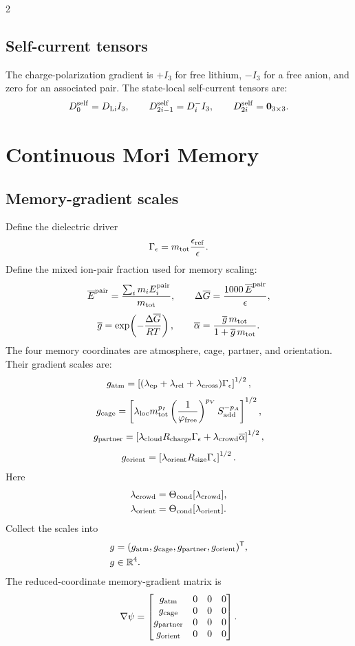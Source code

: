 \documentclass[10pt]{article}
\newcommand{\R}{\mathbb{R}}
\newcommand{\T}{\mathsf{T}}
\newcommand{\zero}{\mathbf{0}}
\begin{document}
\begin{multicols}{2}
\subsection{Self-current tensors}

The charge-polarization gradient is \(+I_3\) for free lithium, \(-I_3\) for a
free anion, and zero for an associated pair. The state-local self-current
tensors are:
\[
D^{\rm self}_0=D_{\rm Li}I_3,
\qquad
D^{\rm self}_{2i-1}=D^-_iI_3,
\qquad
D^{\rm self}_{2i}=\zero_{3\times3}.
\]

\section{Continuous Mori Memory}

\subsection{Memory-gradient scales}

Define the dielectric driver
\[
\Gamma_\epsilon
=
m_{\rm tot}\frac{\epsilon_{\rm ref}}{\epsilon}.
\]
Define the mixed ion-pair fraction used for memory scaling:
\[
\overline{E}^{\rm pair}
=
\frac{\sum_i m_i E^{\rm pair}_i}{m_{\rm tot}},
\qquad
\Delta\overline G
=
\frac{1000\,\overline{E}^{\rm pair}}{\epsilon},
\]
\[
\overline g=\exp\!\left(-\frac{\Delta\overline G}{RT}\right),
\qquad
\overline\alpha
=
\frac{\overline g\,m_{\rm tot}}{1+\overline g\,m_{\rm tot}}.
\]
The four memory coordinates are atmosphere, cage, partner, and orientation.
Their gradient scales are:
\[
g_{\rm atm}
=
\left[
(\lambda_{\rm ep}+\lambda_{\rm rel}+\lambda_{\rm cross})
\Gamma_\epsilon
\right]^{1/2},
\]
\[
g_{\rm cage}
=
\left[
\lambda_{\rm loc}
m_{\rm tot}^{p_I}
\left(\frac{1}{\varphi_{\rm free}}\right)^{p_V}
S_{\rm add}^{-p_A}
\right]^{1/2},
\]
\[
g_{\rm partner}
=
\left[
\lambda_{\rm cloud}R_{\rm charge}\Gamma_\epsilon
+\lambda_{\rm crowd}\overline\alpha
\right]^{1/2},
\]
\[
g_{\rm orient}
=
\left[
\lambda_{\rm orient}R_{\rm size}\Gamma_\epsilon
\right]^{1/2}.
\]
Here
\[
\begin{aligned}
\lambda_{\rm crowd}
&=
\Theta_{\rm cond}[\lambda_{\rm crowd}],\\
\lambda_{\rm orient}
&=
\Theta_{\rm cond}[\lambda_{\rm orient}].
\end{aligned}
\]
Collect the scales into
\[
\begin{aligned}
g
&=
(g_{\rm atm},g_{\rm cage},g_{\rm partner},g_{\rm orient})^\T,\\
g&\in\R^4.
\end{aligned}
\]
The reduced-coordinate memory-gradient matrix is
\[
\nabla\psi =
\begin{bmatrix}
g_{\rm atm} & 0 & 0 & 0\\
g_{\rm cage} & 0 & 0 & 0\\
g_{\rm partner} & 0 & 0 & 0\\
g_{\rm orient} & 0 & 0 & 0
\end{bmatrix}.
\]


\end{multicols}
\end{document}
